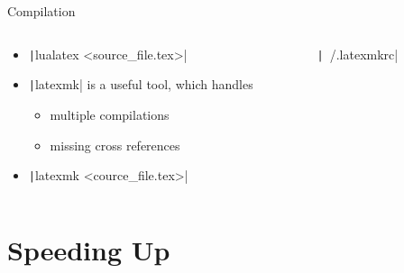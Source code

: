 \documentclass[aspectratio=169]{beamer}
\newcommand{\code}[2][python]{\texttt|#2|}
\begin{document}
%
%
\begin{frame}{Compilation}
    \begin{columns}
        \begin{column}{0.39\textwidth}
            \begin{itemize}
                \item \code{lualatex <source_file.tex>}
                \item \code{latexmk} is a useful tool, which handles
                    \begin{itemize}
                        \item multiple compilations 
                        \item missing cross references
                    \end{itemize}
                \item \code{latexmk <cource_file.tex>}
            \end{itemize}
        \end{column}
        \begin{column}{0.59\textwidth}
            \begin{columns}
                \begin{column}{0.49\textwidth}
                    \code[text]{~/.latexmkrc}\\
                    \inputminted[fontsize=\tiny,bgcolor=cblak,breaklines=true]{bash}{latexmkrc}
                \end{column}
                \begin{column}{0.49\textwidth}
                    \inputminted[fontsize=\tiny,bgcolor=cblak]{bash}{latextree.tex}
                \end{column}
            \end{columns}
        \end{column}
    \end{columns}
\end{frame} 
%
%
\section{Speeding Up}
%
\end{document}
